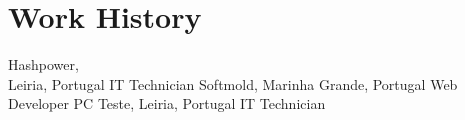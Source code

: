 \section[\faGears]{Work History}
    {Hashpower,\\Leiria, Portugal}
    {IT Technician}
    {}
    {Softmold, Marinha Grande, Portugal}
    {Web Developer}
    {}
    {PC Teste, Leiria, Portugal}
    {IT Technician}
    {}
    
